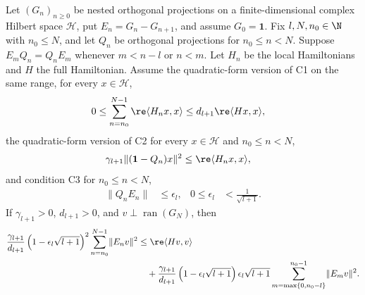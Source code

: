 \begin{lemma}
    \label{thm:nachtergaele_c1_c3_threshold_energy_estimate}
    \leanok
    Let $(G_n)_{n\geq0}$ be nested orthogonal projections on a
    finite-dimensional complex Hilbert space $\mathcal H$, put
    $E_n=G_n-G_{n+1}$, and assume $G_0=\mathbf 1$. Fix $l,N,n_0\in\N$ with
    $n_0\leq N$, and let $Q_n$ be
    orthogonal projections for $n_0\leq n<N$. Suppose $E_mQ_n=Q_nE_m$
    whenever $m<n-l$ or $n<m$. Let $H_n$ be the local Hamiltonians and $H$
    the full Hamiltonian. Assume the quadratic-form version of C1 on the same
    range, for every $x\in\mathcal H$,
    \begin{align}
        0
         & \leq\sum_{n=n_0}^{N-1}\re\langle H_nx,x\rangle
        \leq d_{l+1}\re\langle Hx,x\rangle,
        \label{eq:nachtergaele_c1_threshold_form}
    \end{align}
    the quadratic-form version of C2 for every $x\in\mathcal H$ and
    $n_0\leq n<N$,
    \begin{align}
        \gamma_{l+1}\lVert(\mathbf 1-Q_n)x\rVert^2
         & \leq\re\langle H_nx,x\rangle,
        \label{eq:nachtergaele_c2_threshold_form}
    \end{align}
    and condition C3 for $n_0\leq n<N$,
    \begin{align}
        \lVert Q_nE_n\rVert
         & \leq\epsilon_l,
         & 0\leq\epsilon_l
         & <\frac{1}{\sqrt{l+1}}.
        \label{eq:nachtergaele_c3_threshold_form}
    \end{align}
    If $\gamma_{l+1}>0$, $d_{l+1}>0$, and $v\perp\operatorname{ran}(G_N)$,
    then
    \begin{align}
        \frac{\gamma_{l+1}}{d_{l+1}}
        \left(1-\epsilon_l\sqrt{l+1}\right)^2
        \sum_{n=n_0}^{N-1}\lVert E_nv\rVert^2
         & \leq
        \re\langle Hv,v\rangle
        \nonumber \\
         & \quad
        +\frac{\gamma_{l+1}}{d_{l+1}}
        \left(1-\epsilon_l\sqrt{l+1}\right)\epsilon_l\sqrt{l+1}
        \sum_{m=\max\{0,n_0-l\}}^{n_0-1}\lVert E_mv\rVert^2.
        \label{eq:nachtergaele_c1_c3_threshold_energy_estimate}

\end{align}
\end{lemma}
